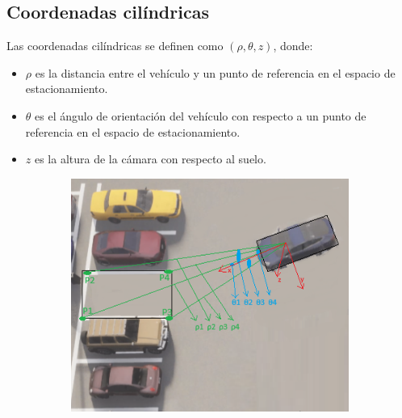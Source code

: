 \subsection{Coordenadas cilíndricas}

Las coordenadas cilíndricas se definen como $(\rho, \theta, z)$, donde:
\begin{itemize}
    \item $\rho$ es la distancia entre el vehículo y un punto de referencia en el espacio de estacionamiento.
    \item $\theta$ es el ángulo de orientación del vehículo con respecto a un punto de referencia en el espacio de estacionamiento.
    \item $z$ es la altura de la cámara con respecto al suelo.
\end{itemize}
\begin{figure}[!ht]
    \centering
    \begin{subfigure}{0.4\textwidth}
        \includegraphics[width=\textwidth]{img/distances_ubi_31}\label {fig:distances31}
    \end{subfigure}
    \begin{subfigure}{0.4\textwidth}

\end{subfigure}
\end{figure}
